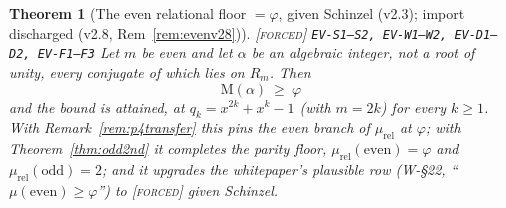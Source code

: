 \documentclass[11pt]{article}
\newcommand{\tagF}{\textcolor{cF}{\textsc{[forced]}}}
\newcommand{\hx}[1]{\textcolor{cC}{\footnotesize\texttt{#1}}}
\newcommand{\gp}{\varphi}
\newcommand{\M}{\mathrm{M}}
\theoremstyle{plain}
\newtheorem{theorem}{Theorem}[section]
\theoremstyle{definition}
\theoremstyle{remark}
\begin{document}
\begin{theorem}[The even relational floor {$=\gp$}, given Schinzel (v2.3); import discharged (v2.8, Rem~\ref{rem:evenv28})]\label{thm:evenfloor}\tagF{} \hx{EV-S1--S2, EV-W1--W2, EV-D1--D2, EV-F1--F3}
Let $m$ be \emph{even} and let $\alpha$ be an algebraic integer, not a root of
unity, every conjugate of which lies on $R_m$. Then
\[
\boxed{\ \M(\alpha)\ \ge\ \gp\ }
\]
and the bound is attained, at $q_k=x^{2k}+x^k-1$ (with $m=2k$) for every $k\ge1$.
With Remark~\ref{rem:p4transfer} this pins the even branch of $\mu_{\mathrm{rel}}$
at $\gp$; with Theorem~\ref{thm:odd2nd} it completes the parity floor,
$\mu_{\mathrm{rel}}(\text{even})=\gp$ and $\mu_{\mathrm{rel}}(\text{odd})=2$; and
it upgrades the whitepaper's plausible row (W-\S22, ``$\mu(\text{even})\ge\gp$'')
to \tagF{} given Schinzel.
\end{theorem}
\end{document}
